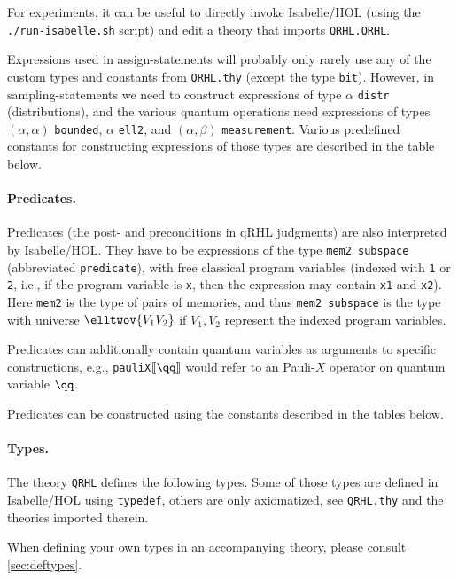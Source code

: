 \documentclass{article}
\begin{document}
For experiments, it can be useful to directly invoke Isabelle/HOL
(using the \texttt{./run-isabelle.sh} script) and edit a theory that
imports \texttt{QRHL.QRHL}.

Expressions used in assign-statements will probably only rarely use
any of the custom types and constants from \texttt{QRHL.thy} (except the type
\texttt{bit}). However, in sampling-statements we need to construct
expressions of type $\alpha$
\texttt{distr} (distributions), and the various quantum operations
need expressions of types $(\alpha,\alpha)$
\texttt{bounded}, $\alpha$
\texttt{ell2}, and $(\alpha,\beta)$
\texttt{measurement}. Various predefined constants for constructing
expressions of those types are described in the table below.


\paragraph{Predicates.} Predicates (the post- and preconditions in
qRHL judgments) are also interpreted by Isabelle/HOL. They have to be
expressions of the type \texttt{mem2 subspace} (abbreviated \texttt{predicate}),
with free classical
program variables (indexed with \texttt{1} or \texttt{2}, i.e., if the
program variable is \texttt{x}, then the expression may contain
\texttt{x1} and \texttt{x2}). Here \texttt{mem2} is the type of pairs
of memories, and thus \texttt{mem2 subspace} is the type with universe
$\elltwov{V_1V_2}$
if $V_1,V_2$ represent the indexed program variables.

Predicates can additionally contain quantum variables as arguments to
specific constructions, e.g., \texttt{pauliX\guillemotright$\llbracket\qq\rrbracket$}
would refer to an Pauli-$X$ operator on quantum variable $\qq$.

Predicates can be constructed using the constants described in the
tables below.



\paragraph{Types.} The theory \texttt{QRHL} defines the following
types. Some of those types are defined in Isabelle/HOL using
\texttt{typedef}, others are only axiomatized, see
\texttt{QRHL.thy} and the theories imported therein.

When defining your own types in an accompanying theory, please consult \autoref{sec:deftypes}.
\end{document}
